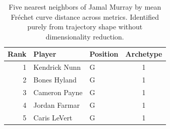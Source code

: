 \begin{table}[htbp]
  \centering\small
  \begin{tabular}{rllc}
    \toprule
    Rank & Player & Position & Archetype \\
    \midrule
    1 & Kendrick Nunn & G & 1 \\
    2 & Bones Hyland & G & 1 \\
    3 & Cameron Payne & G & 1 \\
    4 & Jordan Farmar & G & 1 \\
    5 & Caris LeVert & G & 1 \\
    \bottomrule
  \end{tabular}
  \caption{Five nearest neighbors of Jamal Murray by mean Fr\'{e}chet curve distance across metrics. Identified purely from trajectory shape without dimensionality reduction.}
  \label{tab:Jamal_Murray_frechet_curve_neighbors}
\end{table}

